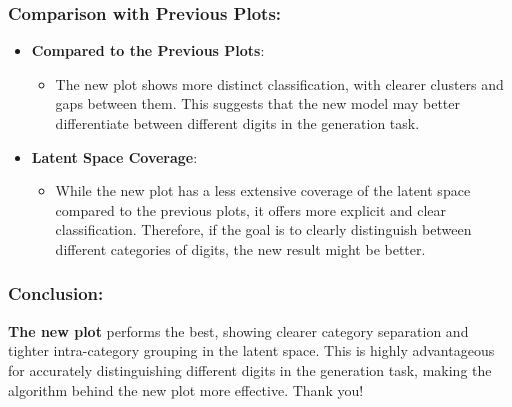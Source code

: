 \documentclass[11pt]{article}
\makeatletter
\providecommand{\tightlist}{%
      \setlength{\itemsep}{0pt}\setlength{\parskip}{0pt}}
\newcommand{\boxspacing}{\kern\kvtcb@left@rule\kern\kvtcb@boxsep}
\newcommand{\prompt}[4]{
        {\ttfamily\llap{{\color{#2}[#3]:\hspace{3pt}#4}}\vspace{-\baselineskip}}
    }
\makeatother
\begin{document}
\subsubsection{Comparison with Previous
Plots:}\label{comparison-with-previous-plots}

\begin{itemize}
\tightlist
\item
  \textbf{Compared to the Previous Plots}:

  \begin{itemize}
  \tightlist
  \item
    The new plot shows more distinct classification, with clearer
    clusters and gaps between them. This suggests that the new model may
    better differentiate between different digits in the generation
    task.
  \end{itemize}
\item
  \textbf{Latent Space Coverage}:

  \begin{itemize}
  \tightlist
  \item
    While the new plot has a less extensive coverage of the latent space
    compared to the previous plots, it offers more explicit and clear
    classification. Therefore, if the goal is to clearly distinguish
    between different categories of digits, the new result might be
    better.
  \end{itemize}
\end{itemize}

\subsubsection{Conclusion:}\label{conclusion}

\textbf{The new plot} performs the best, showing clearer category
separation and tighter intra-category grouping in the latent space. This
is highly advantageous for accurately distinguishing different digits in
the generation task, making the algorithm behind the new plot more
effective. Thank you!

    \begin{tcolorbox}[breakable, size=fbox, boxrule=1pt, pad at break*=1mm,colback=cellbackground, colframe=cellborder]
\prompt{In}{incolor}{ }{\boxspacing}
\begin{Verbatim}[commandchars=\\\{\}]

\end{Verbatim}
\end{tcolorbox}


    
    
    
\end{document}
